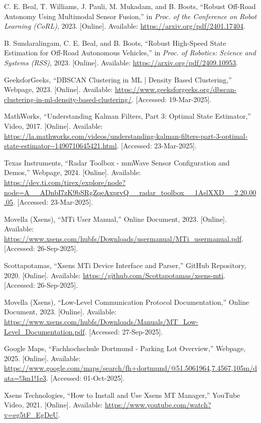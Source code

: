 \begin{thebibliography}{00}
C. E. Beal, T. Williams, J. Pauli, M. Mukadam, and B. Boots, 
``Robust Off-Road Autonomy Using Multimodal Sensor Fusion,'' 
in \textit{Proc. of the Conference on Robot Learning (CoRL)}, 2023. 
[Online]. Available: \url{https://arxiv.org/pdf/2401.17404}. 

B. Sundaralingam, C. E. Beal, and B. Boots, 
``Robust High-Speed State Estimation for Off-Road Autonomous Vehicles,'' 
in \textit{Proc. of Robotics: Science and Systems (RSS)}, 2023. 
[Online]. Available: \url{https://arxiv.org/pdf/2409.10953}. 

GeeksforGeeks, ``DBSCAN Clustering in ML | Density Based Clustering,'' Webpage, 2023. 
[Online]. Available: \url{https://www.geeksforgeeks.org/dbscan-clustering-in-ml-density-based-clustering/}. [Accessed: 19-Mar-2025].

MathWorks, ``Understanding Kalman Filters, Part 3: Optimal State Estimator,'' Video, 2017. 
[Online]. Available: \url{https://la.mathworks.com/videos/understanding-kalman-filters-part-3-optimal-state-estimator--1490710645421.html}. [Accessed: 23-Mar-2025].

Texas Instruments, ``Radar Toolbox - mmWave Sensor Configuration and Demos,'' Webpage, 2024. 
[Online]. Available: \url{https://dev.ti.com/tirex/explore/node?node=A__ADnbI7zK9bSRgZqeAxprvQ__radar_toolbox__1AslXXD__2.20.00.05}. [Accessed: 23-Mar-2025].

Movella (Xsens), ``MTi User Manual,'' Online Document, 2023. 
[Online]. Available: \url{https://www.xsens.com/hubfs/Downloads/usermanual/MTi_usermanual.pdf}. [Accessed: 26-Sep-2025].  

Scottapotamas, ``Xsens MTi Device Interface and Parser,'' GitHub Repository, 2020. 
[Online]. Available: \url{https://github.com/Scottapotamas/xsens-mti}. [Accessed: 26-Sep-2025].  

Movella (Xsens), ``Low-Level Communication Protocol Documentation,'' Online Document, 2023. 
[Online]. Available: \url{https://www.xsens.com/hubfs/Downloads/Manuals/MT_Low-Level_Documentation.pdf}. [Accessed: 27-Sep-2025].  

Google Maps, ``Fachhochschule Dortmund - Parking Lot Overview,'' Webpage, 2025. 
[Online]. Available: \url{https://www.google.com/maps/search/fh+dortmund/@51.5061964,7.4567,105m/data=!3m1!1e3}. [Accessed: 01-Oct-2025].

Xsens Technologies, ``How to Install and Use Xsens MT Manager,'' YouTube Video, 2021. 
[Online]. Available: \url{https://www.youtube.com/watch?v=eg5tF_EgDeU}. 

\end{thebibliography}
